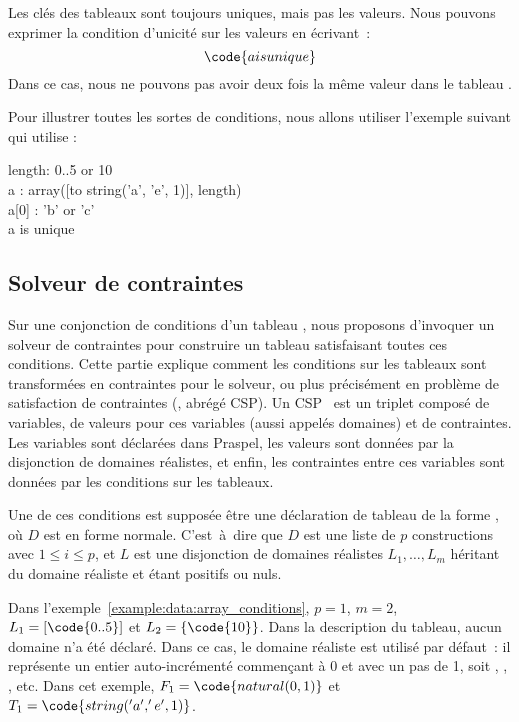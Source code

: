 Les clés des tableaux sont toujours uniques, mais pas les valeurs. Nous pouvons
exprimer la condition d'unicité sur les valeurs en écrivant~:
%
$$\code{a is unique}$$
%
Dans ce cas, nous ne pouvons pas avoir deux fois la même valeur dans le tableau
.

\begin{example}
\label{example:data:array_conditions}
Pour illustrer toutes les sortes de conditions, nous allons utiliser l'exemple
suivant qui utilise :

\begin{pre}
length: 0..5 or 10 \\
a     : array([to string('a', 'e', 1)], length) \\
a[0]  : 'b' or 'c' \\
a is unique
\end{pre}

\end{example}

\subsection{Solveur de contraintes}

Sur une conjonction de conditions d'un tableau , nous proposons
d'invoquer un solveur de contraintes pour construire un tableau satisfaisant
toutes ces conditions. Cette partie explique comment les conditions sur les
tableaux sont transformées en contraintes pour le solveur, ou plus précisément
en problème de satisfaction de contraintes (, abrégé CSP). Un CSP~ est un triplet composé de
variables, de valeurs pour ces variables (aussi appelés domaines) et de
contraintes. Les variables sont déclarées dans Praspel, les valeurs sont données
par la disjonction de domaines réalistes, et enfin, les contraintes entre ces
variables sont données par les conditions sur les tableaux.

Une de ces conditions est supposée être une déclaration de tableau de la forme
, où $D$ est en forme normale. C'est~à~dire que $D$ est
une liste de $p$ constructions  avec $1 \leq i \leq
p$, et $L$ est une disjonction de domaines réalistes $L_1, \dots, L_m$ héritant
du domaine réaliste  et étant positifs ou nuls.

Dans l'exemple~\ref{example:data:array_conditions}, $p = 1$, $m = 2$, $L_1 =
[\code{0..5}]$ et $L_2 = \{\code{10}\}$. Dans la description du tableau, aucun
domaine n'a été déclaré. Dans ce cas, le domaine réaliste 
est utilisé par défaut~: il représente un entier auto-incrémenté commençant à 0
et avec un pas de 1, soit , , ,  etc. Dans cet
exemple, $F_1 = \code{natural(0, 1)}$ et $T_1 = \code{string('a', 'e', 1)}$.

